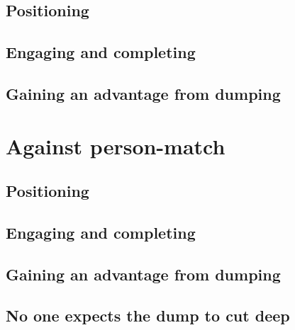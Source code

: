 \documentclass{tufte-handout}
\begin{document}
\subsection{Positioning}
\label{sec:zone_positioning}

\subsection{Engaging and completing}
\label{sec:zone_engaging}

\subsection{Gaining an advantage from dumping}
\label{sec:zone_advantage}


\section{Against person-match}
\subsection{Positioning}
\label{sec:person-match_positioning}

\subsection{Engaging and completing}
\label{sec:person-match_engaging}

\subsection{Gaining an advantage from dumping}
\label{sec:person-match_advantage}





\subsection{No one expects the dump to cut deep}
\end{document}

